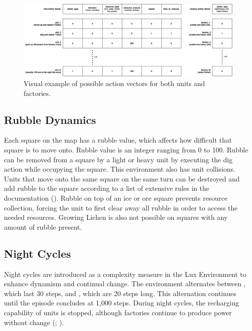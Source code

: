         \begin{figure}[htbp]
            \centering
            \includegraphics[width=1\linewidth]{images/intro_luxenv/action/action_example.png}
            \captionsetup{justification=justified, singlelinecheck=false, width=1\linewidth, labelfont=bf}
            \caption{Visual example of possible action vectors for both units and factories.}
            \label{fig:lux-actions_ex}
        \end{figure}

    \subsection{Rubble Dynamics}
    
        \noindent Each square on the map has a rubble value, which affects how difficult that square is to move onto. Rubble value is an integer ranging from 0 to 100. Rubble can be removed from a square by a light or heavy unit by executing the dig action while occupying the square. This environment also has unit collisions. Units that move onto the same square on the same turn can be destroyed and add rubble to the square according to a list of extensive rules in the documentation (\textcolor{deepblue}{\cite{lux-ai-season-2}}). Rubble on top of an ice or ore square prevents resource collection, forcing the unit to first clear away all rubble in order to access the needed resources. Growing Lichen is also not possible on squares with any amount of rubble present.

    \subsection{Night Cycles}
    
        \noindent Night cycles are introduced as a complexity measure in the Lux Environment to enhance dynamism and continual change. The environment alternates between , which last 30 steps, and , which are 20 steps long. This alternation continues until the episode concludes at 1,000 steps. During night cycles, the recharging capability of units is stopped, although factories continue to produce power without change (\textcolor{deepblue}{\cite{lux-ai-season-2}; \cite{chen2023emergent}}).

